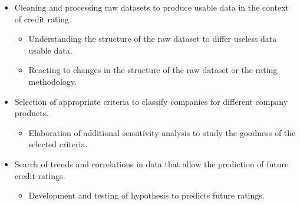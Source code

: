 \documentclass[10pt,a4paper,normalphoto,ragged2e]{altacv}
\begin{document}

\begin{fullwidth}
\makecvheader
\end{fullwidth}


\begin{itemize}
    \item Cleaning and processing raw datasets to produce usable data in the context of credit rating. 
    \begin{itemize}[label=\textendash]
        \item Understanding the structure of the raw dataset to differ useless data usable data. 
        \item Reacting to changes in the structure of the raw dataset or the rating methodology.
    \end{itemize}
    \item Selection of appropriate criteria to classify companies for different company products. 
    \begin{itemize}[label=\textendash]
        \item Elaboration of additional sensitivity analysis to study the goodness of the selected criteria.
    \end{itemize}
    \item Search of trends and correlations in data that allow the prediction of future credit ratings. 
    \begin{itemize}[label=\textendash]
        \item Development and testing of hypothesis to predicts future ratings. 
    \end{itemize}

\end{itemize}
\vspace{-3mm}
\divider
\end{document}
